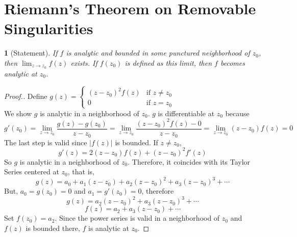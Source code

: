 \documentclass[12pt]{article}
\theoremstyle{named}
\newtheorem*{theorem}{}
\begin{document}
%

\section{Riemann's Theorem on Removable Singularities}
\begin{theorem}[Statement]
	If $f$ is analytic and bounded in some punctured neighborhood of $z_0$, then $\lim_{z \to z_0} f(z)$
	exists.  If $f(z_0)$ is defined as this limit, then $f$ becomes analytic at $z_0$.
\end{theorem}
\begin{proof}[Proof.]
Define $g(z) =
	\begin{cases}
		(z - z_0 )^2 f(z) & \text{if } z \neq z_0 \\
		0       & \text{if } z = z_0
	\end{cases}
$
\\ We show $g$ is analytic in a neighborhood of $z_0$.  $g$ is differentiable at $z_0$ because
$$ g'(z_0) = \lim_{z \to z_0} \frac{g(z) - g(z_0)}{z - z_0} = \lim_{z \to z_0} \frac{(z-z_0)^2 f(z) - 0}{z - z_0} = \lim_{z \to z_0} (z-z_0) f(z) = 0 $$
The last step is valid since $|f(z)|$ is bounded.  If $z \neq z_0$,
$$ g'(z) = 2(z-z_0)f(z) + (z-z_0)^2 f'(z) $$
So $g$ is analytic in a neighborhood of $z_0$.  Therefore, it coincides with its Taylor Series centered at $z_0$, that is,
$$ g(z) = a_0 + a_1 (z-z_0) + a_2 (z-z_0)^2 + a_3 (z-z_0)^3 + \cdots $$
But, $a_0 = g(z_0) = 0$ and $a_1 = g'(z_0) = 0$, therefore
$$ g(z) = a_2 (z-z_0)^2 + a_3 (z-z_0)^3 + \cdots $$
$$ f(z) = a_2 + a_3(z-z_0) + \cdots $$
Set $f(z_0) = a_2$.  Since the power series is valid in a neighborhood of $z_0$ and $f(z)$ is bounded there,
$f$ is analytic at $z_0$.

\end{proof}

%
\end{document}
